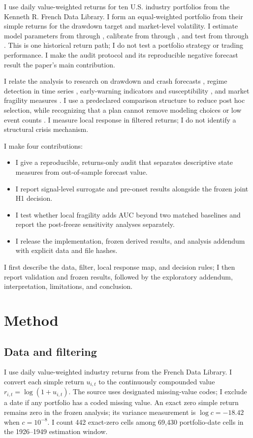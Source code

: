 \documentclass[11pt]{article}
\begin{document}
I use daily value-weighted returns for ten U.S. industry portfolios from the Kenneth R. French Data Library. I form an equal-weighted portfolio from their simple returns for the drawdown target and market-level volatility. I estimate model parameters from \EstimationStart{} through \EstimationEnd, calibrate from \CalibrationStart{} through \CalibrationEnd, and test from \TestStart{} through \SampleEnd. This is one historical return path; I do not test a portfolio strategy or trading performance. I make the audit protocol and its reproducible negative forecast result the paper's main contribution.

I relate the analysis to research on drawdown and crash forecasts \cite{DichtlCrash}, regime detection in time series \cite{Hamilton}, early-warning indicators and susceptibility \cite{Scheffer}, and market fragility measures \cite{Kritzman}. I use a predeclared comparison structure to reduce post hoc selection, while recognizing that a plan cannot remove modeling choices or low event counts \cite{CoffmanNiederle}. I measure local response in filtered returns; I do not identify a structural crisis mechanism.

I make four contributions:
\begin{itemize}
\item I give a reproducible, returns-only audit that separates descriptive state measures from out-of-sample forecast value.
\item I report signal-level surrogate and pre-onset results alongside the frozen joint H1 decision.
\item I test whether local fragility adds AUC beyond two matched baselines and report the post-freeze sensitivity analyses separately.
\item I release the implementation, frozen derived results, and analysis addendum with explicit data and file hashes.
\end{itemize}
I first describe the data, filter, local response map, and decision rules; I then report validation and frozen results, followed by the exploratory addendum, interpretation, limitations, and conclusion.

\section{Method}
\subsection{Data and filtering}
I use daily value-weighted industry returns from the French Data Library. I convert each simple return $u_{i,t}$ to the continuously compounded value $r_{i,t}=\log(1+u_{i,t})$. The source uses designated missing-value codes; I exclude a date if any portfolio has a coded missing value. An exact zero simple return remains zero in the frozen analysis; its variance measurement is $\log c=-18.42$ when $c=10^{-8}$. I count 442 exact-zero cells among 69,430 portfolio-date cells in the 1926--1949 estimation window.
\end{document}
